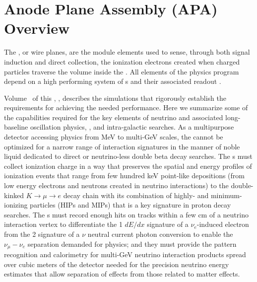 \section{Anode Plane Assembly (APA) Overview}
\label{sec:fdsp-apa-intro}

The , or wire planes, are the   module elements used to sense, through both signal induction and direct collection, the ionization electrons created when charged particles traverse the  volume inside the .   All elements of the  physics program depend on a high performing system of s and their associated readout .  

Volume~\volnumberphysics{} of this , \voltitlephysics, %
describes the simulations that rigorously establish the requirements for achieving the needed performance.  Here we summarize some of the  capabilities required for the key elements of neutrino  and associated long-baseline oscillation physics, , and intra-galactic  searches.  As a multipurpose detector accessing physics from MeV to multi-GeV scales, the   cannot be optimized for a narrow range of interaction signatures in the manner of noble liquid  dedicated to direct  or neutrino-less double beta decay searches.  The s must collect ionization charge in a way that preserves the spatial and energy profiles of ionization events that range from few hundred keV point-like depositions (from low energy electrons and neutrons created in  neutrino interactions) to the double-kinked $K\rightarrow\mu\rightarrow{e}$ decay chain with its combination of highly- and minimum-ionizing particles (HIPs and MIPs) that is a key signature in proton decay searches.  The s must record enough hits on tracks within a few cm of a neutrino interaction vertex to differentiate the 1  $dE/dx$ signature of a $\nu_e$-induced electron from the 2  signature of a $\nu$ neutral current photon conversion to enable the $\nu_\mu-\nu_e$ separation demanded for  physics; and they must provide the pattern recognition and calorimetry for multi-GeV neutrino interaction products  spread over cubic meters of the detector needed for the precision neutrino energy estimates that allow separation of  effects from those related to matter effects. 
 
